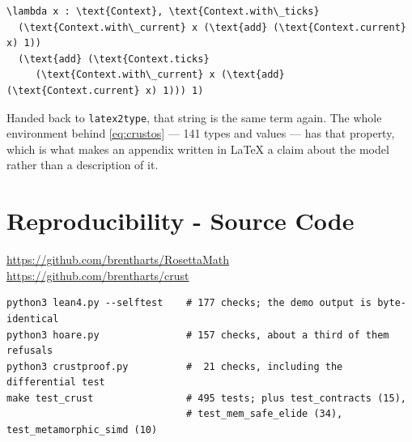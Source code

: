 \documentclass[11pt]{article}
\newcommand{\code}[1]{\texttt{#1}}
\begin{document}
\begin{lstlisting}[language={},caption={\code{type2latex(value\_of(env, 'sched.pass1'))}: line-wrapped to fit, and otherwise character for character what the printer emitted.},label={lst:raw}]
\lambda x : \text{Context}, \text{Context.with\_ticks}
  (\text{Context.with\_current} x (\text{add} (\text{Context.current} x) 1))
  (\text{add} (\text{Context.ticks}
     (\text{Context.with\_current} x (\text{add} (\text{Context.current} x) 1))) 1)
\end{lstlisting}

\noindent
Handed back to \code{latex2type}, that string is the same term again. The
whole environment behind \eqref{eq:crustos} --- 141 types and values --- has
that property, which is what makes an appendix written in \LaTeX{} a claim
about the model rather than a description of it.

\section*{Reproducibility - Source Code}

\url{https://github.com/brentharts/RosettaMath} \\
\url{https://github.com/brentharts/crust}

\begin{lstlisting}[language={}]
python3 lean4.py --selftest    # 177 checks; the demo output is byte-identical
python3 hoare.py               # 157 checks, about a third of them refusals
python3 crustproof.py          #  21 checks, including the differential test
make test_crust                # 495 tests; plus test_contracts (15),
                               # test_mem_safe_elide (34), test_metamorphic_simd (10)
\end{lstlisting}
\end{document}
